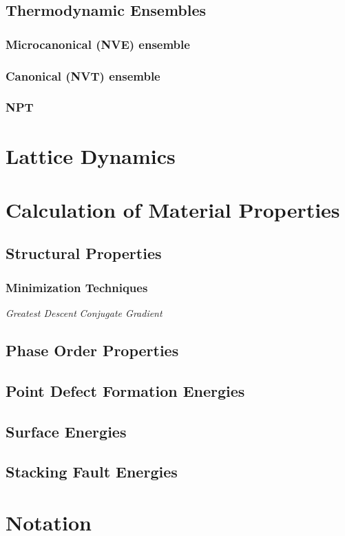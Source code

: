 \subsection{Thermodynamic Ensembles}
\subsubsection{Microcanonical (NVE) ensemble}
\subsubsection{Canonical (NVT) ensemble}
\subsubsection{NPT}
\section{Lattice Dynamics}
\section{Calculation of Material Properties}
\subsection{Structural Properties}
\subsubsection{Minimization Techniques}
\emph{Greatest Descent}
\emph{Conjugate Gradient}
\subsection{Phase Order Properties}
\subsection{Point Defect Formation Energies}
\subsection{Surface Energies}
\subsection{Stacking Fault Energies}

\section{Notation}
